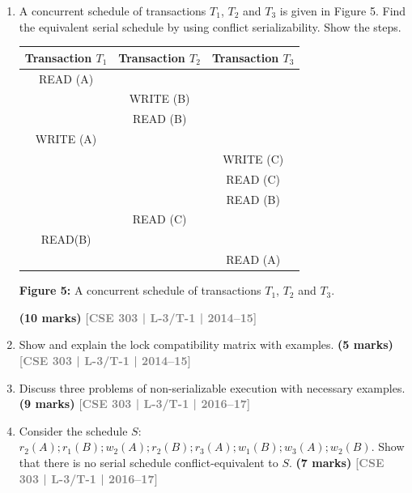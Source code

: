 \documentclass[12pt,a3paper]{article}
\newcommand{\yr}[1]{\hfill\textcolor{gray}{\small\textbf{[#1]}}}
\newcommand{\mk}[1]{\textcolor{orange!70!black}{\small\textbf{(#1 marks)}}}
\begin{document}
\begin{enumerate}
\item A concurrent schedule of transactions $T_1$, $T_2$ and $T_3$ is given in Figure 5. Find the equivalent serial schedule by using conflict serializability. Show the steps.

\begin{center}
  \renewcommand{\arraystretch}{1.4} %
    \begin{tabular}{c|c|c}
        \textbf{Transaction $T_1$} & \textbf{Transaction $T_2$} & \textbf{Transaction $T_3$} \\ \hline
        READ (A) &           &           \\ \hline
                 & WRITE (B) &           \\ \hline
                 & READ (B)  &           \\ \hline
        WRITE (A)&           &           \\ \hline
                 &           & WRITE (C) \\ \hline
                 &           & READ (C)  \\ \hline
                 &           & READ (B)  \\ \hline
                 & READ (C)  &           \\ \hline
        READ(B)  &           &           \\ \hline
                 &           & READ (A)  \\ \hline
    \end{tabular}
    
    \vspace{0.4cm}
    \textbf{Figure 5:} A concurrent schedule of transactions $T_1$, $T_2$ and $T_3$.
\end{center}

\mk{10} \yr{CSE 303 | L-3/T-1 | 2014--15}

\item Show and explain the lock compatibility matrix with examples.
\mk{5} \yr{CSE 303 | L-3/T-1 | 2014--15}

\item Discuss three problems of non-serializable execution with necessary examples.
\mk{9} \yr{CSE 303 | L-3/T-1 | 2016--17}

\item Consider the schedule $S$: $r_2(A); r_1(B); w_2(A); r_2(B); r_3(A); w_1(B); w_3(A); w_2(B)$. Show that there is no serial schedule conflict-equivalent to $S$.
\mk{7} \yr{CSE 303 | L-3/T-1 | 2016--17}


\end{enumerate}
\end{document}
